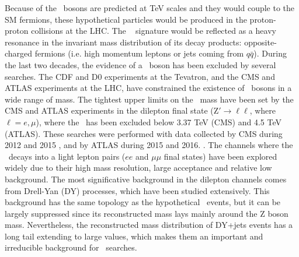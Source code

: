 
Because of the \Zprime~bosons are predicted at TeV scales and they would couple to the SM fermions, 
these hypothetical particles would be produced in the proton-proton collisions at the LHC. The \Zprime~ 
signature would be reflected as a heavy resonance in the invariant mass distribution of its 
decay products: opposite-charged fermions (i.e. high momentum leptons or jets coming from $q\bar{q}$). During 
the last two decades, the evidence of a \Zprime~boson has been excluded by several searches. 
The CDF \cite{CDFZprimedielectronbib,CDFZprimedimuonbib,CDFZprimeditaubib,CDFZprimeditopbib}  
and D0 \cite{D0Zprimesearchesbib,D0Zprimetodielectronbib,D0Zprimeditopbib} experiments at the Tevatron, and
the CMS \cite{CMSZprimetodileptonrun1run2, CMSZprimetodileptonrun1, CMSZprimetodileptonrun1sqrt7, CMSZprimetotautaurun1,
CMSZprimetotautauemu, CMSZprimetotautau2015, CMSZprimeto4leptons, CMSZprimeHplusZ, CMSZprimetotoptoprun1, CMSZprimetodibjetsrun1, CMSZprimedijetrun2} and 
ATLAS \cite{ATLASZprimetodileptonrun2, ATLASZprimetodilepton2015, ATLASZprimetodilepton2012, ATLASZprimetodileptonrun1, ATLASZprimetotautau2016,
ATLASZprimetotautau2015, ATLASZprimetotautaurun1, ATLASZprimetotautau2011, ATLASZprimetojet2015, ATLASZprimetobjet2015} experiments at the LHC, have 
constrained the existence of \Zprime~bosons in a wide range of mass. The tightest upper limits on the \Zprime~mass have 
been set by the CMS and ATLAS experiments in the dilepton final state (Z$'\rightarrow \ell\ell$, where $\ell=e, \mu$), where the \ZprimeSSM~has been 
excluded below 3.37 TeV (CMS) and 4.5 TeV (ATLAS). These searches were performed
with data collected by CMS during 2012 and 2015 \cite{CMSZprimetodileptonrun1run2}, and by ATLAS 
during 2015 and 2016. \cite{ATLASZprimetodileptonrun2}. The channels
where the \Zprime~decays into a light lepton pairs ($ee$ and $\mu\mu$ final states) have been explored
widely due to their high mass resolution, large acceptance and relative low background. The most significative 
background in the dilepton channels comes from Drell-Yan (DY) processes, which have been studied extensively. This 
background has the same topology as the hypothetical \Zprime~events, but it can be largely 
suppressed since its reconstructed mass lays mainly around the Z boson mass. Nevertheless, the 
reconstructed mass distribution of DY+jets events has a long tail extending to large values, which 
makes them an important and irreducible background for \Zprime~searches.  \\


